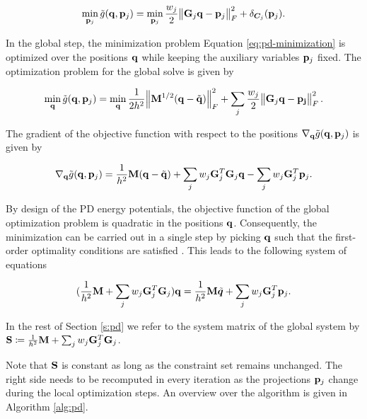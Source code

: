 \begin{equation}\label{eq:pd-local-minimization}
    \min_{\mathbf{p}_j} \tilde{g}(\mathbf{q}, \mathbf{p}_j) =
    \min_{\mathbf{p}_j} \frac{w_j}{2}\norm{\mathbf{G}_j\mathbf{q} - \mathbf{p}_j}^2_F + \delta_{\bm{C}_j}(\mathbf{p}_j).
\end{equation}

\noindent In the global step, the minimization problem Equation \ref{eq:pd-minimization} is optimized over the positions $\mathbf{q}$ 
while keeping the auxiliary variables $\mathbf{p}_j$ fixed. The optimization problem for the global solve is 
given by

\begin{equation}\label{eq:pd-global-minimization}
    \min_{\mathbf{q}} \tilde{g}(\mathbf{q}, \mathbf{p}_j) =
    \min_{\mathbf{q}} \frac{1}{2h^2} \norm{\mathbf{M}^{1/2}(\mathbf{q} - \tilde{\mathbf{q}})}^2_F + \sum_j \frac{w_j}{2} \norm{\mathbf{G}_j\mathbf{q} - \mathbf{p_j}}^2_F.
\end{equation}

\noindent The gradient of the objective function with respect to the positions $\nabla_{\mathbf{q}} 
\tilde{g}(\mathbf{q}, \mathbf{p}_j)$ is given by 

\begin{equation}\label{eq:pd-gradient-q}
    \nabla_{\mathbf{q}}\tilde{g}(\mathbf{q}, \mathbf{p}_j) = \frac{1}{h^2}\mathbf{M}(\mathbf{q} - \tilde{\mathbf{q}}) + \sum_j w_j \mathbf{G}^T_j \mathbf{G}_j \mathbf{q}
    - \sum_j w_j \mathbf{G}^T_j \mathbf{p}_j.
\end{equation}

\noindent By design of the PD energy potentials, the objective function of the global optimization problem is quadratic in the positions 
$\mathbf{q}$. Consequently, the minimization can be carried out in a single step by picking $\mathbf{q}$ such that the first-order optimality 
conditions are satisfied \cite{nocedal2006}. This leads to the following system of equations

\begin{equation}\label{eq:pd-global-system}
    (\frac{1}{h^2}\mathbf{M} + \sum_j w_j \mathbf{G}_j^T \mathbf{G}_j)\mathbf{q} = \frac{1}{h^2}\mathbf{M}\tilde{\bm{q}} + \sum_j w_j \mathbf{G}_j^T \mathbf{p}_j.
\end{equation}

\noindent In the rest of Section \ref{s:pd} we refer to the system matrix of the global system by 
$\mathbf{S} \coloneqq \frac{1}{h^2}\mathbf{M} + \sum_j w_j \mathbf{G}_j^T \mathbf{G}_j$.

Note that $\mathbf{S}$ is constant as long as the constraint set remains unchanged. The right side needs to be recomputed in every 
iteration as the projections $\mathbf{p}_j$ change during the local optimization steps.  An overview over the algorithm is given in 
Algorithm \ref{alg:pd}.

